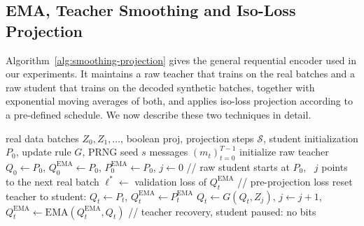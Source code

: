 \documentclass{article}
\theoremstyle{plain}
\theoremstyle{definition}
\theoremstyle{remark}
\begin{document}
\subsection{EMA, Teacher Smoothing and Iso-Loss Projection}\label{app:smoothing-projection}
Algorithm~\ref{alg:smoothing-projection} gives the general requential encoder used in our experiments. It maintains a raw teacher that trains on the real batches and a raw student that trains on the decoded synthetic batches, together with exponential moving averages of both, and applies iso-loss projection according to a pre-defined schedule.  We now describe these two techniques in detail.


\begin{algorithm}[t]
\caption{\small\textbf{Requential encoding with teacher smoothing and iso-loss projection.} The raw teacher $Q$ trains on the real batches $Z_0, Z_1, \ldots$ and the raw student $P$ on the decoded synthetic batches. We initialize the teacher from the same point as the student and explicitly show its updates. We keep exponential moving averages $Q^{\text{EMA}}$ and $P^{\text{EMA}},$ used as the REC target and reference. The boolean $\mathrm{proj}$ toggles iso-loss projection at the steps $\mathcal{S}$.  $Q$ and $P$ are understood to be bundled with their optimizer states (the Adam moments), so the assignment copies the full training state of the student into the teacher's upon each reset. }
\label{alg:smoothing-projection}
\footnotesize
\begin{algorithmic}[1]
\REQUIRE real data batches $Z_0, Z_1, \ldots$, \; boolean $\mathrm{proj}$, \; projection steps $\mathcal{S}$, \; student initialization $P_0$, \; update rule $G$, \; PRNG seed $s$
\ENSURE messages $(m_t)_{t=0}^{T-1}$
\STATE initialize raw teacher $Q_0 \leftarrow P_0$, \quad $Q^{\text{EMA}}_0 \leftarrow P_0$, \; $P^{\text{EMA}}_0 \leftarrow P_0$, \; $j \leftarrow 0$ \hfill {\color{black!55}// raw student starts at $P_0$, \, $j$ points to the next real batch}
    \STATE $\ell^\ast \leftarrow$ validation loss of $Q^{\text{EMA}}_t$ \hfill {\color{black!55}// pre-projection loss}
    \STATE reset teacher to student: $Q_t \leftarrow P_t$, \; $Q^{\text{EMA}}_t \leftarrow P^{\text{EMA}}_t$
      \STATE $Q_t \leftarrow G(Q_t, Z_j)$, \; $j \leftarrow j+1$, \; $Q^{\text{EMA}}_t \leftarrow \mathrm{EMA}(Q^{\text{EMA}}_t, Q_t)$ \hfill {\color{black!55}// teacher recovery, student paused: no bits}

\end{algorithmic}
\end{algorithm}
\end{document}
